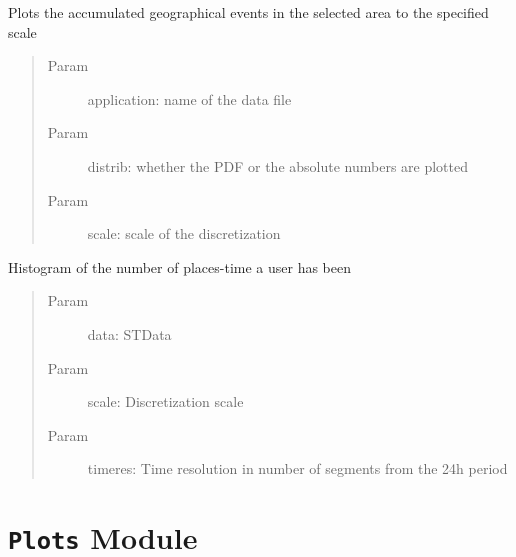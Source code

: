 \documentclass[letterpaper,10pt,english]{sphinxmanual}
\begin{document}

\begin{fulllineitems}
\label{index:SuperHub.Descriptive.plot_accumulated_events}
Plots the accumulated geographical events in the selected area to the
specified scale
\begin{quote}\begin{description}
\item[{Param }] \leavevmode
application: name of the data file

\item[{Param }] \leavevmode
distrib: whether the PDF or the absolute numbers are plotted

\item[{Param }] \leavevmode
scale: scale of the discretization

\end{description}\end{quote}

\end{fulllineitems}


\begin{fulllineitems}
\label{index:SuperHub.Descriptive.user_events_histogram}
Histogram of the number of places-time a user has been
\begin{quote}\begin{description}
\item[{Param }] \leavevmode
data: STData

\item[{Param }] \leavevmode
scale: Discretization scale

\item[{Param }] \leavevmode
timeres: Time resolution in number of segments from the 24h period

\end{description}\end{quote}

\end{fulllineitems}



\chapter{\texttt{Plots} Module}
\label{index:plots-module}\label{index:module-SuperHub.Plots}\label{index:module-SuperHub.Plot}
\end{document}
